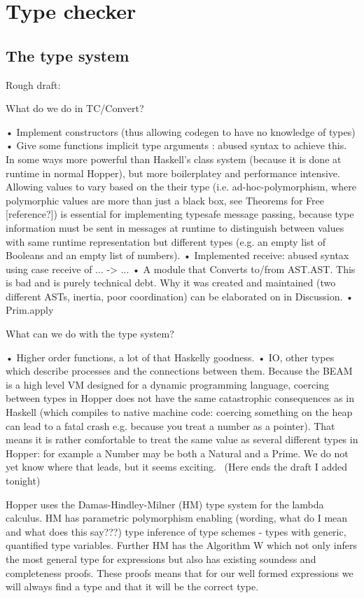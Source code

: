 \section{Type checker}


\subsection{The type system}
Rough draft:
\

What do we do in TC/Convert?\

•	Implement constructors (thus allowing codegen to have no knowledge of types)
•	Give some functions implicit type arguments : abused syntax to achieve this. In some ways more powerful than Haskell’s class system (because it is done at runtime in normal Hopper), but more boilerplatey and performance intensive. Allowing values to vary based on the their type (i.e. ad-hoc-polymorphism, where polymorphic values are more than just a black box, see Theorems for Free [reference?]) is essential for implementing typesafe message passing, because type information must be sent in messages at runtime to distinguish between values with same runtime representation but different types (e.g. an empty list of Booleans and an empty list of numbers).
•	Implemented receive: abused syntax using case receive of ... -> ...
•	A module that Converts to/from AST.AST. This is bad and is purely technical debt. Why it was created and maintained (two different ASTs, inertia, poor coordination) can be elaborated on in Discussion.
•	Prim.apply\

What can we do with the type system?\

•	Higher order functions, a lot of that Haskelly goodness.
•	IO, other types which describe processes and the connections between them. Because the BEAM is a high level VM designed for a dynamic programming language, coercing between types in Hopper does not have the same catastrophic consequences as in Haskell (which compiles to native machine code: coercing something on the heap can lead to a fatal crash e.g. because you treat a number as a pointer). That means it is rather comfortable to treat the same value as several different types in Hopper: for example a Number may be both a Natural and a Prime. We do not yet know where that leads, but it seems exciting. 
\
(Here ends the draft I added tonight)
\


Hopper uses the Damas-Hindley-Milner (HM) type system for the lambda calculus. HM has parametric polymorphism enabling (wording, what do I mean and what does this say???) type inference of type schemes - types with generic, quantified type variables. Further HM has the Algorithm W which not only infers the most general type for expressions but also has existing soundess and completeness proofs. These proofs means that for our well formed expressions we will always find a type and that it will be the correct type.

